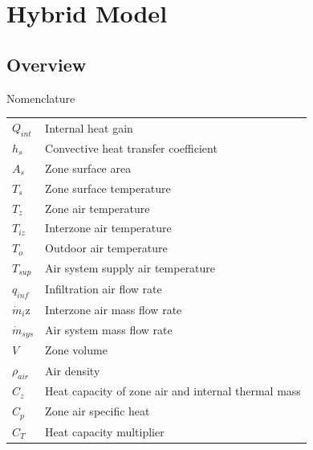 \section{Hybrid Model}\label{hybrid-model}

\subsection{Overview}

Nomenclature\\
\begin{tabular}{ll}
$Q_{int}$ & Internal heat gain\\
$h_s$ & Convective heat transfer coefficient\\
$A_s$ & Zone surface area\\
$T_s$ & Zone surface temperature\\
$T_z$ & Zone air temperature\\
$T_{iz}$ & Interzone air temperature\\
$T_o$ & Outdoor air temperature\\
$T_{sup}$ & Air system supply air temperature\\
$q_{inf}$ & Infiltration air flow rate\\
$\dot{m}_i$z & Interzone air mass flow rate\\
$\dot{m}_{sys}$ & Air system mass flow rate\\
$V$ & Zone volume\\
$\rho_{air}$ & Air density\\
$C_z$ & Heat capacity of zone air and internal thermal mass\\
$C_p$ & Zone air specific heat\\
$C_T$ & Heat capacity multiplier\\
\end{tabular}

